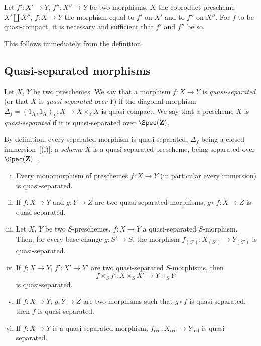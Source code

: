 \begin{proposition}[1.1.6]
\label{IV.1.1.6}
Let $f':X'\to Y$, $f'':X''\to Y$ be two morphisms, $X$ the coproduct prescheme
$X'\coprod X''$, $f:X\to Y$ the morphism equal to $f'$ on $X'$ and to $f''$ on $X''$. For $f$ to be
quasi-compact, it is necessary and sufficient that $f'$ and $f''$ be so.
\end{proposition}

This follows immediately from the definition.

\subsection{Quasi-separated morphisms}
\label{subsection:IV.1.2}

\begin{definition}[1.2.1]
\label{IV.1.2.1}
Let $X$, $Y$ be two preschemes. We say that a morphism $f:X\to Y$ is
\emph{quasi-separated} (or that $X$ is \emph{quasi-separated over} $Y$) if the diagonal morphism $\Delta_f=(1_X,1_X)_Y:X\to X\times_Y X$
is quasi-compact. We say that a prescheme $X$ is \emph{quasi-separated} if it is quasi-separated over $\Spec(\mathbf{Z})$.
\end{definition}

By definition, every separated morphism is quasi-separated, $\Delta_f$ being a closed immersion~[(i)]; a \emph{scheme} $X$ is a quasi-separated prescheme, being separated over
$\Spec(\mathbf{Z})$~.

\begin{proposition}[1.2.2]
\label{IV.1.2.2}
\medskip\noindent
\begin{enumerate}[(i)]
  \item Every monomorphism of preschemes $f:X\to Y$ \textnormal{(}in particular
    every immersion\textnormal{)} is quasi-separated.
  \item If $f:X\to Y$ and $g:Y\to Z$ are two quasi-separated morphisms, $g\circ f:X\to Z$ is
    quasi-separated.
  \item Let $X$, $Y$ be two $S$-preschemes, $f:X\to Y$ a quasi-separated $S$-morphism. Then,
    for every base change $g:S'\to S$, the morphism $f_{(S')}:X_{(S')}\to Y_{(S')}$ is quasi-separated.
  \item If $f:X\to Y$, $f':X'\to Y'$ are two quasi-separated $S$-morphisms, then
    \[
      f\times_S f': X\times_S X'\to Y\times_S Y'
    \]
    is quasi-separated.
  \item If $f:X\to Y$, $g:Y\to Z$ are two morphisms such that $g\circ f$ is quasi-separated, then $f$
    is quasi-separated.
  \item If $f:X\to Y$ is a quasi-separated morphism, $f_{\mathrm{red}}:X_{\mathrm{red}}\to Y_{\mathrm{red}}$ is quasi-separated.
\end{enumerate}
\end{proposition}


